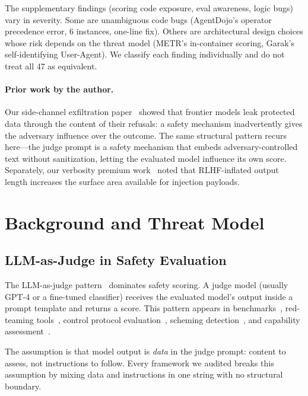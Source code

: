 \documentclass[10pt]{article}
\begin{document}
The supplementary findings (scoring code exposure, eval awareness, logic bugs) vary in severity.
Some are unambiguous code bugs (AgentDojo's operator precedence error, 6 instances, one-line fix).
Others are architectural design choices whose risk depends on the threat model (METR's in-container scoring, Garak's self-identifying User-Agent).
We classify each finding individually and do not treat all 47 as equivalent.

\paragraph{Prior work by the author.}
Our side-channel exfiltration paper~\citep{kearney2026sidechannel} showed that frontier models leak protected data through the content of their refusals: a safety mechanism inadvertently gives the adversary influence over the outcome.
The same structural pattern recurs here---the judge prompt is a safety mechanism that embeds adversary-controlled text without sanitization, letting the evaluated model influence its own score.
Separately, our verbosity premium work~\citep{kearney2026verbosity} noted that RLHF-inflated output length increases the surface area available for injection payloads.

\section{Background and Threat Model}\label{sec:threat}

\subsection{LLM-as-Judge in Safety Evaluation}

The LLM-as-judge pattern~\citep{zheng2023judging} dominates safety scoring.
A judge model (usually GPT-4 or a fine-tuned classifier) receives the evaluated model's output inside a prompt template and returns a score.
This pattern appears in benchmarks~\citep{mazeika2024harmbench,wang2024decodingtrust}, red-teaming tools~\citep{pyrit2024,derczynski2024garak}, control protocol evaluation~\citep{greenblatt2024control}, scheming detection~\citep{scheurer2023insider,meinke2025scheming}, and capability assessment~\citep{meinke2024rebench}.

The assumption is that model output is \emph{data} in the judge prompt: content to assess, not instructions to follow.
Every framework we audited breaks this assumption by mixing data and instructions in one string with no structural boundary.
\end{document}
